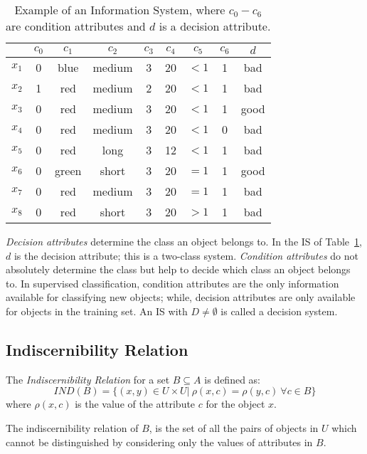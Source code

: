 \documentclass[number,preprint,review,12pt]{elsarticle}
\begin{document}
 \begin{table}[htb]
		\caption{Example of an Information System, where $c_0-c_6$ are condition attributes and $d$ is a decision attribute.} \label{tab_IS}
		\centering
 	\begin{tabular}{c||c|c|c|c|c|c|c||c}
 			  & $c_0$ & $c_1$ & $c_2$ &  $c_3$ & $c_4$ & $c_5$ &  $c_6$ & $d$ \\
 		\hline \hline
		$x_1$ & 0 & blue  & medium & 3 & 20 & $<1$  & 1 & bad   \\
		$x_2$ & 1 & red   & medium & 2 & 20 & $<1$  & 1 & bad   \\
		$x_3$ & 0 & red   & medium & 3 & 20 & $<1$  & 1 & good   \\
		$x_4$ & 0 & red   & medium & 3 & 20 & $<1$  & 0 & bad   \\
		$x_5$ & 0 & red   & long   & 3 & 12 & $<1$  & 1 & bad   \\
		$x_6$ & 0 & green & short  & 3 & 20 & $=1$  & 1 & good   \\
		$x_7$ & 0 & red   & medium & 3 & 20 & $=1$  & 1 & bad   \\
		$x_8$ & 0 & red   & short  & 3 & 20 & $>1$  & 1 & bad   \\
 	\end{tabular}             
 \end{table}
 
  \textit{Decision attributes} determine the class an object belongs to. In the IS of Table~\ref{tab_IS}, $d$ is the decision attribute; this is a two-class system. \textit{Condition attributes} do not absolutely determine the class but help to decide which class an object belongs to. In supervised classification, condition attributes are the only information available for classifying new objects; while, decision attributes are only available for objects in the training set. An IS with $D \neq \emptyset$ is called a decision system.
  
\subsection{Indiscernibility Relation}\label{subsect_Pos}
  The \textit{Indiscernibility Relation} for a set $B \subseteq A$ is defined as:
  $$IND(B) = \lbrace (x,y)\in U\times U|~\rho(x,c)=\rho(y,c)~\forall c \in B \rbrace $$
  where $\rho(x,c)$ is the value of the attribute $c$ for the object $x$.
  
  The indiscernibility relation of $B$, is the set of all the pairs of objects in $U$ which cannot be distinguished by considering only the values of attributes in $B$.
 
\end{document}
